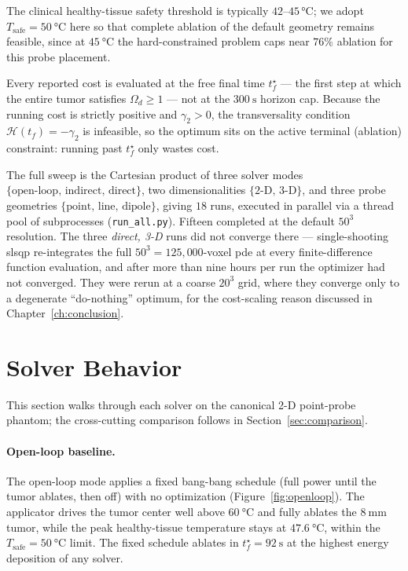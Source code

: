 The clinical healthy-tissue safety threshold is typically
$42$--$45\,\si{\degreeCelsius}$; we adopt
$T_{\text{safe}} = \SI{50}{\degreeCelsius}$ here so that complete ablation
of the default geometry remains feasible, since at
$\SI{45}{\degreeCelsius}$ the hard-constrained problem caps near $76\%$
ablation for this probe placement.

Every reported cost is evaluated at the free final time $t_f^\star$ ---
the first step at which the entire tumor satisfies $\Omega_d \geq 1$ ---
not at the $\SI{300}{\second}$ horizon cap. Because the running cost is
strictly positive and $\gamma_2 > 0$, the transversality condition
$\mathcal{H}(t_f) = -\gamma_2$ is infeasible, so the optimum sits on the
active terminal (ablation) constraint: running past $t_f^\star$ only
wastes cost.

The full sweep is the Cartesian product of three solver modes
$\{\text{open-loop},\,\text{indirect},\,\text{direct}\}$, two
dimensionalities $\{\text{2-D},\,\text{3-D}\}$, and three probe
geometries $\{\text{point},\,\text{line},\,\text{dipole}\}$, giving
$18$ runs, executed in parallel via a thread pool of subprocesses
(\texttt{run\_all.py}).
Fifteen completed at the default $50^3$ resolution. The three
\emph{direct, 3-D} runs did not converge there --- single-shooting
\gls{slsqp} re-integrates the full $50^3 = 125{,}000$-voxel \gls{pde} at
every finite-difference function evaluation, and after more than nine
hours per run the optimizer had not converged. They were rerun at a
coarse $20^3$ grid, where they converge only to a degenerate
``do-nothing'' optimum, for the cost-scaling reason discussed in
Chapter~\ref{ch:conclusion}.

\section{Solver Behavior}
\label{sec:solver-behavior}

This section walks through each solver on the canonical 2-D point-probe
phantom; the cross-cutting comparison follows in
Section~\ref{sec:comparison}.

\paragraph{Open-loop baseline.}
The open-loop mode applies a fixed bang-bang schedule (full power until
the tumor ablates, then off) with no optimization
(Figure~\ref{fig:openloop}). The applicator drives the tumor center well
above $\SI{60}{\degreeCelsius}$ and fully ablates the $\SI{8}{\mm}$ tumor,
while the peak healthy-tissue temperature stays at
$\SI{47.6}{\degreeCelsius}$, within the
$T_{\text{safe}} = \SI{50}{\degreeCelsius}$ limit. The fixed schedule
ablates in $t_f^\star = \SI{92}{\second}$ at the highest energy
deposition of any solver.

